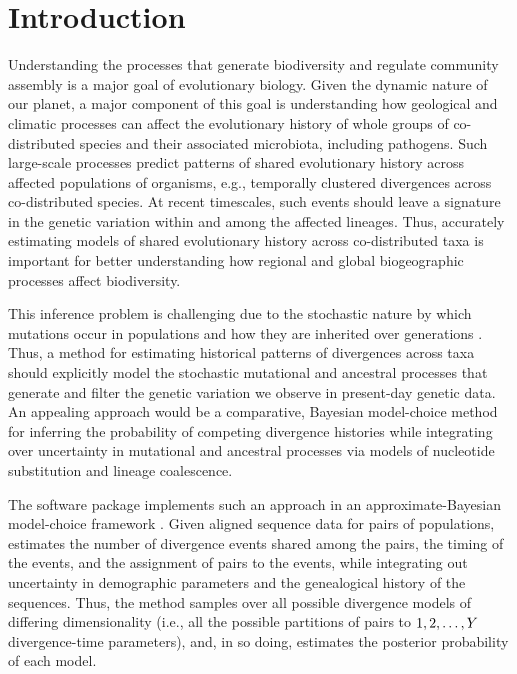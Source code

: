 \section*{Introduction}
Understanding the processes that generate biodiversity and regulate
community assembly is a major goal of evolutionary biology.
Given the dynamic nature of our planet, a major component of this goal is
understanding how geological and climatic processes can affect the
evolutionary history of whole groups of co-distributed species and their
associated microbiota, including pathogens.
Such large-scale processes predict patterns of shared evolutionary history
across affected populations of organisms, e.g., temporally clustered
divergences across co-distributed species.
At recent timescales, such events should leave a signature in the genetic
variation within and among the affected lineages.
Thus, accurately estimating models of shared evolutionary history across
co-distributed taxa is important for better understanding how regional and
global biogeographic processes affect biodiversity.

This inference problem is challenging due to the stochastic nature by which
mutations occur in populations and how they are inherited over generations
\citep{Hudson1990,WakeleyCoalescent}.
Thus, a method for estimating historical patterns of divergences across taxa
should explicitly model the stochastic mutational and ancestral processes that
generate and filter the genetic variation we observe in present-day genetic
data.
An appealing approach would be a comparative, Bayesian model-choice method for
inferring the probability of competing divergence histories while integrating
over uncertainty in mutational and ancestral processes via models of nucleotide
substitution and lineage coalescence.

The software package \msb implements such an approach in an
approximate-Bayesian model-choice framework \citep{Hickerson2006,Huang2011}.
Given aligned sequence data for \npairs{} pairs of populations, \msb 
estimates the number of divergence events shared among the pairs, the timing of
the events, and the assignment of pairs to the events, while integrating out
uncertainty in demographic parameters and the genealogical history of the
sequences.
Thus, the method samples over all possible divergence models of differing
dimensionality (i.e., all the possible partitions of \npairs{} pairs to
$1,2,\ldots,Y_{}$ divergence-time parameters), and, in so doing, estimates
the posterior probability of each model.

